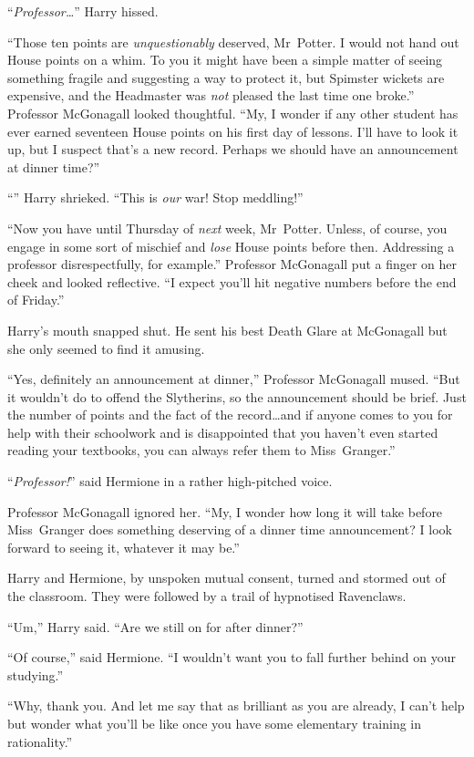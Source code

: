 “\emph{Professor…}” Harry hissed.

“Those ten points are \emph{unquestionably} deserved, Mr~Potter. I would not hand out House points on a whim. To you it might have been a simple matter of seeing something fragile and suggesting a way to protect it, but Spimster wickets are expensive, and the Headmaster was \emph{not} pleased the last time one broke.” Professor McGonagall looked thoughtful. “My, I wonder if any other student has ever earned seventeen House points on his first day of lessons. I’ll have to look it up, but I suspect that’s a new record. Perhaps we should have an announcement at dinner time?”

“” Harry shrieked. “This is \emph{our} war! Stop meddling!”

“Now you have until Thursday of \emph{next} week, Mr~Potter. Unless, of course, you engage in some sort of mischief and \emph{lose} House points before then. Addressing a professor disrespectfully, for example.” Professor McGonagall put a finger on her cheek and looked reflective. “I expect you’ll hit negative numbers before the end of Friday.”

Harry’s mouth snapped shut. He sent his best Death Glare at McGonagall but she only seemed to find it amusing.

“Yes, definitely an announcement at dinner,” Professor McGonagall mused. “But it wouldn’t do to offend the Slytherins, so the announcement should be brief. Just the number of points and the fact of the record…and if anyone comes to you for help with their schoolwork and is disappointed that you haven’t even started reading your textbooks, you can always refer them to Miss~Granger.”

“\emph{Professor!}” said Hermione in a rather high-pitched voice.

Professor McGonagall ignored her. “My, I wonder how long it will take before Miss~Granger does something deserving of a dinner time announcement? I look forward to seeing it, whatever it may be.”

Harry and Hermione, by unspoken mutual consent, turned and stormed out of the classroom. They were followed by a trail of hypnotised Ravenclaws.

“Um,” Harry said. “Are we still on for after dinner?”

“Of course,” said Hermione. “I wouldn’t want you to fall further behind on your studying.”

“Why, thank you. And let me say that as brilliant as you are already, I can’t help but wonder what you’ll be like once you have some elementary training in rationality.”


